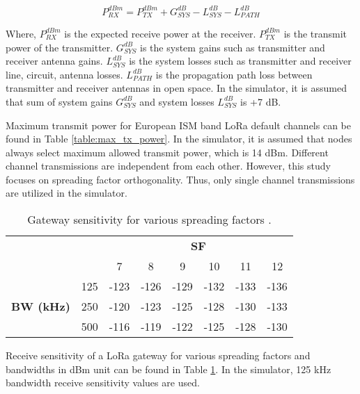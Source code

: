 \begin{equation} \label{eq:expected_rx_power}
P^{dBm}_{RX} = P^{dBm}_{TX} + G^{dB}_{SYS} - L^{dB}_{SYS} - L^{dB}_{PATH}
\end{equation}

Where, $P^{dBm}_{RX}$ is the expected receive power at the receiver. $P^{dBm}_{TX}$ is the transmit power of the transmitter. $G^{dB}_{SYS}$ is the system gains such as transmitter and receiver antenna gains. $L^{dB}_{SYS}$ is the system losses such as transmitter and receiver line, circuit, antenna losses. $L^{dB}_{PATH}$ is the propagation path loss between transmitter and receiver antennas in open space. In the simulator, it is assumed that sum of system gains $G^{dB}_{SYS}$ and system losses $L^{dB}_{SYS}$ is +7 dB.

Maximum transmit power for European ISM band LoRa default channels can be found in Table \ref{table:max_tx_power}. In the simulator, it is assumed that nodes always select maximum allowed transmit power, which is 14 dBm. Different channel transmissions are independent from each other. However, this study focuses on spreading factor orthogonality. Thus, only single channel transmissions are utilized in the simulator.

\begin{table}
\centering
\caption{Gateway sensitivity for various spreading factors \cite{SX1276}.}
\label{table:gw_sf_sensitivity}
\begin{tabular}{|c|c|c|c|c|c|c|c|}
\hline
\multicolumn{2}{|c|}{\multirow{2}{*}{}} & \multicolumn{6}{c|}{\textbf{SF}} \\ \cline{3-8}
\multicolumn{2}{|c|}{}                  &    7 &    8 &    9 &   10 &   11 &   12 \\ \hline
\multirow{3}{*}{\textbf{BW (kHz)}}  & 125 & -123 & -126 & -129 & -132 & -133 & -136 \\ \cline{2-8}
                                    & 250 & -120 & -123 & -125 & -128 & -130 & -133 \\ \cline{2-8}
                                    & 500 & -116 & -119 & -122 & -125 & -128 & -130 \\ \hline
\end{tabular}
\end{table}

Receive sensitivity of a LoRa gateway for various spreading factors and bandwidths in dBm unit can be found in Table \ref{table:gw_sf_sensitivity}. In the simulator, 125 kHz bandwidth receive sensitivity values are used.

